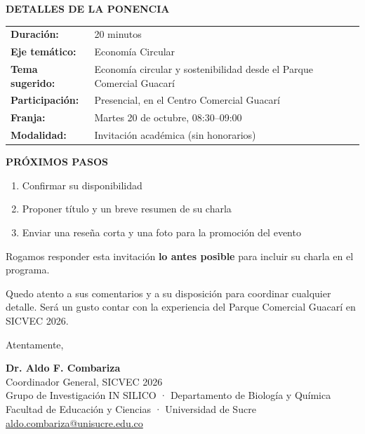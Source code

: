 \documentclass[11pt,a4paper]{article}
\begin{document}
\vspace{0.1cm}

\noindent
\textbf{DETALLES DE LA PONENCIA}

\begin{tabular}{ll}
\textbf{Duración:} & 20 minutos \\
\textbf{Eje temático:} & Economía Circular \\
\textbf{Tema sugerido:} & Economía circular y sostenibilidad desde el Parque Comercial Guacarí \\
\textbf{Participación:} & Presencial, en el Centro Comercial Guacarí \\
\textbf{Franja:} & Martes 20 de octubre, 08:30--09:00 \\
\textbf{Modalidad:} & Invitación académica (sin honorarios) \\
\end{tabular}

\vspace{0.1cm}

\noindent
\textbf{PRÓXIMOS PASOS}

\begin{enumerate}
  \item Confirmar su disponibilidad
  \item Proponer título y un breve resumen de su charla
  \item Enviar una reseña corta y una foto para la promoción del evento
\end{enumerate}

Rogamos responder esta invitación \textbf{lo antes posible} para incluir su charla en el programa.

\vspace{0.1cm}

Quedo atento a sus comentarios y a su disposición para coordinar cualquier detalle. Será un gusto contar con la experiencia del Parque Comercial Guacarí en SICVEC 2026.

\vspace{0.15cm}

Atentamente,

\vspace{0.15cm}

\textbf{Dr. Aldo F. Combariza}\\
Coordinador General, SICVEC 2026\\
Grupo de Investigación IN SILICO · Departamento de Biología y Química\\
Facultad de Educación y Ciencias · Universidad de Sucre\\
\href{mailto:aldo.combariza@unisucre.edu.co}{aldo.combariza@unisucre.edu.co}

\vspace{0.1cm}
\end{document}

